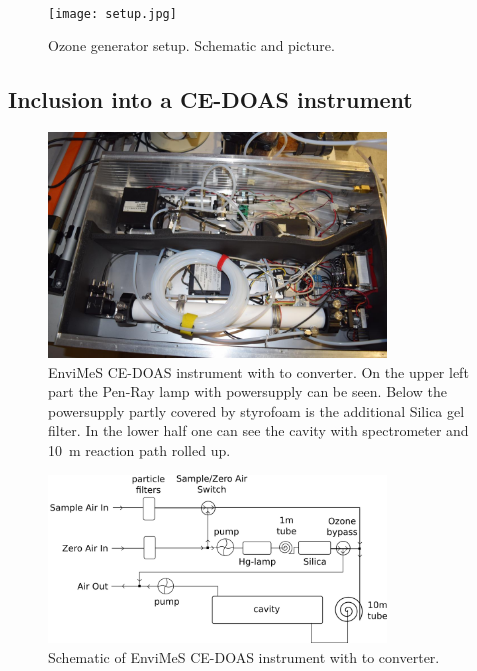\begin{figure}[htbp]
  \centering
  {
  \def\svgwidth{0.9\linewidth}
  
  }
  \phantom{h}\\
  \bigskip
  \texttt{[image: setup.jpg]}
  \caption{Ozone generator setup. Schematic and picture.}
  \label{fig:setup}
\end{figure}

\subsection{Inclusion into a CE-DOAS instrument}
\label{sec:inclusion}

\begin{figure}[htbp]
  \centering
  \includegraphics[width=0.8\textwidth]{images/envimes_up.jpg}
  \caption{EnviMeS CE-DOAS instrument with  to 
    converter. On the upper left part the Pen-Ray lamp with
    powersupply can be seen. Below the powersupply partly covered by
    styrofoam is the additional Silica gel filter. In the lower half
    one can see the cavity with spectrometer and \SI{10}{\meter}
    reaction path rolled up.}
  \label{fig:envimes}
\end{figure}

\begin{figure}[htbp]
  \centering
  \includegraphics[width=0.8\textwidth]{images/envimes_setup.png}
  \caption{Schematic of EnviMeS CE-DOAS instrument with  to
     converter.}
  \label{fig:envimes-schematic}
\end{figure}

